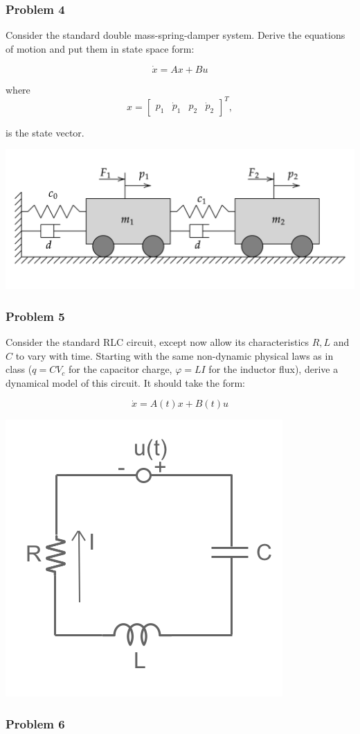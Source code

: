 \subsubsection{Problem 4}\label{problem-4}

Consider the standard double mass-spring-damper system. Derive the
equations of motion and put them in state space form:

\[ \dot{x} = A x + B u \]

where \[
x = \begin{bmatrix} p_1 & \dot{p}_1 & p_2 & \dot{p}_2 \end{bmatrix}^{T},
\]

is the state vector.

\includegraphics[width=0.5\linewidth,height=\textheight,keepaspectratio]{./figures/hw1_fig2.png}

\subsubsection{Problem 5}\label{problem-5}

Consider the standard RLC circuit, except now allow its characteristics
\(R, L\) and \(C\) to vary with time. Starting with the same non-dynamic
physical laws as in class (\(q = CV_c\) for the capacitor charge,
\(\varphi = LI\) for the inductor flux), derive a dynamical model of
this circuit. It should take the form:

\[ \dot{x} = A(t) x + B(t) u \]

\includegraphics[width=0.3\linewidth,height=\textheight,keepaspectratio]{./figures/hw1_fig1.png}

\subsubsection{Problem 6}\label{problem-6}

